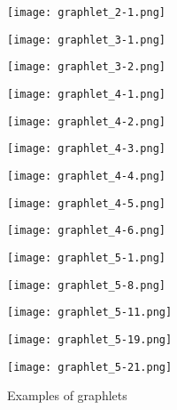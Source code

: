 \begin{figure}[th]
\begin{center}
\hspace*{\fill}
  \texttt{[image: graphlet\_2-1.png]}
  \caption*{$H_1^{(2)}$}
\endminipage\hfill
{}
  \texttt{[image: graphlet\_3-1.png]}
  \caption*{$H_1^{(3)}$}
\endminipage\hfill
{}
  \texttt{[image: graphlet\_3-2.png]}
  \caption*{$H_2^{(3)}$}\label{}
\endminipage
\hspace*{\fill}
\vskip 5pt
\hspace*{\fill}
%
  \texttt{[image: graphlet\_4-1.png]}
  \caption*{$H_1^{(4)}$}
\endminipage\hfill
{}
  \texttt{[image: graphlet\_4-2.png]}
  \caption*{$H_2^{(4)}$}
\endminipage\hfill
{}
  \texttt{[image: graphlet\_4-3.png]}
  \caption*{$H_3^{(4)}$}
\endminipage\hfill
{}
  \texttt{[image: graphlet\_4-4.png]}
  \caption*{$H_4^{(4)}$}\label{}
\endminipage\hfill
{}%
  \texttt{[image: graphlet\_4-5.png]}
  \caption*{$H_5^{(4)}$}
\endminipage\hspace*{\fill}
%
  \texttt{[image: graphlet\_4-6.png]}
  \caption*{$H_6^{(4)}$}
\endminipage\hspace*{\fill}
\hspace*{\fill}
\vskip 5pt
\hspace*{\fill}
%
  \texttt{[image: graphlet\_5-1.png]}
  \caption*{$H_1^{(5)}$}
\endminipage\hfill
{}
  \texttt{[image: graphlet\_5-8.png]}
  \caption*{$H_8^{(5)}$}
\endminipage\hfill
{}
  \texttt{[image: graphlet\_5-11.png]}
  \caption*{$H_{11}^{(5)}$}
\endminipage\hfill
{}
  \texttt{[image: graphlet\_5-19.png]}
  \caption*{$H_{19}^{(5)}$}\label{}
\endminipage\hfill
{}%
  \texttt{[image: graphlet\_5-21.png]}
  \caption*{$H_{21}^{(5)}$}
\endminipage\hspace*{\fill}
\caption{Examples of graphlets}
\label{fig:graphlets}
\end{center}
\end{figure}


